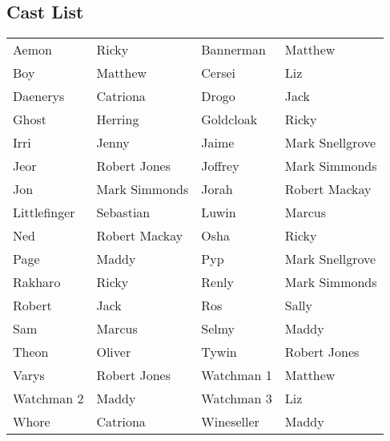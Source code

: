 \subsection*{Cast List}
\begin{tabular}{ll|ll}\\
Aemon & Ricky &  Bannerman & Matthew\\
Boy & Matthew &  Cersei & Liz\\
Daenerys & Catriona &  Drogo & Jack\\
Ghost & Herring &  Goldcloak & Ricky\\
Irri & Jenny &  Jaime & Mark Snellgrove\\
Jeor & Robert Jones &  Joffrey & Mark Simmonds\\
Jon & Mark Simmonds &  Jorah & Robert Mackay\\
Littlefinger & Sebastian &  Luwin & Marcus\\
Ned & Robert Mackay &  Osha & Ricky\\
Page & Maddy &  Pyp & Mark Snellgrove\\
Rakharo & Ricky &  Renly & Mark Simmonds\\
Robert & Jack &  Ros & Sally\\
Sam & Marcus &  Selmy & Maddy\\
Theon & Oliver &  Tywin & Robert Jones\\
Varys & Robert Jones &  Watchman 1 & Matthew\\
Watchman 2 & Maddy &  Watchman 3 & Liz\\
Whore & Catriona &  Wineseller & Maddy\\
\end{tabular}
